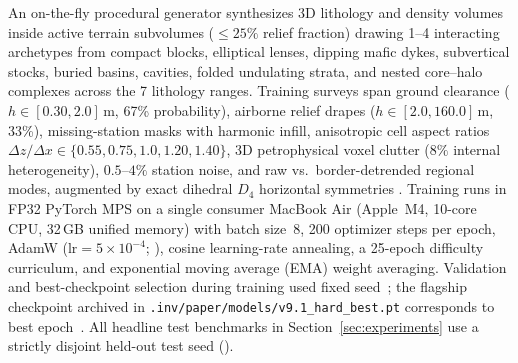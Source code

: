 \documentclass[11pt,a4paper]{article}
\begin{document}
An on-the-fly procedural generator synthesizes 3D lithology and density volumes inside active terrain subvolumes ($\le 25\%$ relief fraction) drawing 1--4 interacting archetypes from compact blocks, elliptical lenses, dipping mafic dykes, subvertical stocks, buried basins, cavities, folded undulating strata, and nested core--halo complexes across the 7 lithology ranges. Training surveys span ground clearance ($h \in [0.30, 2.0]$\,m, 67\% probability), airborne relief drapes ($h \in [2.0, 160.0]$\,m, 33\%), missing-station masks with harmonic infill, anisotropic cell aspect ratios $\Delta z/\Delta x \in \{0.55, 0.75, 1.0, 1.20, 1.40\}$, 3D petrophysical voxel clutter ($8\%$ internal heterogeneity), $0.5\text{--}4\%$ station noise, and raw vs.\ border-detrended regional modes, augmented by exact dihedral $D_4$ horizontal symmetries \citep{cerovsky_mod3d}. Training runs in FP32 PyTorch MPS on a single consumer MacBook Air (Apple~M4, 10-core CPU, 32\,GB unified memory) with batch size~8, 200 optimizer steps per epoch, AdamW ($\text{lr}=5\times 10^{-4}$; \citealp{loshchilov2019adamw}), cosine learning-rate annealing, a 25-epoch difficulty curriculum, and exponential moving average (EMA) weight averaging. Validation and best-checkpoint selection during training used fixed seed~\valTrainValSeed{}; the flagship checkpoint archived in \texttt{.inv/paper/models/v9.1\_hard\_best.pt} corresponds to best epoch~\valVNineOneEp{}. All headline test benchmarks in Section~\ref{sec:experiments} use a strictly disjoint held-out test seed (\valTestSeed{}).
\end{document}
